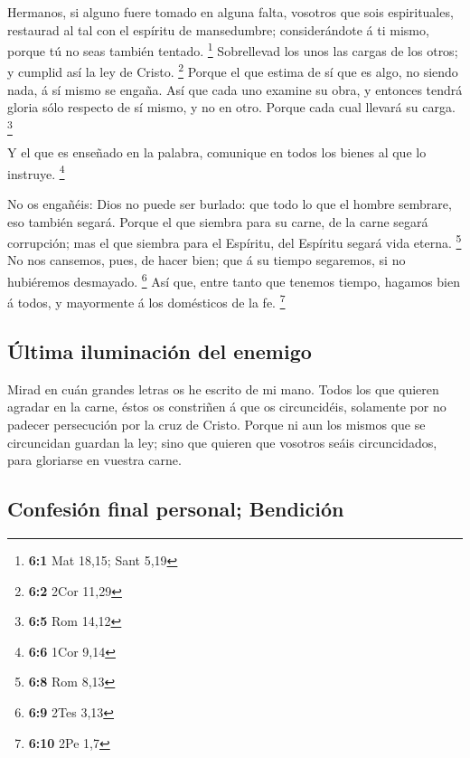 Hermanos, si alguno fuere tomado en alguna falta,
vosotros que sois espirituales, restaurad al tal con el espíritu de
mansedumbre; considerándote á ti mismo, porque tú no seas también
tentado. \footnote{\textbf{6:1} Mat 18,15; Sant 5,19} 
Sobrellevad los unos las cargas de los otros; y cumplid así la ley de
Cristo. \footnote{\textbf{6:2} 2Cor 11,29}  Porque el que
estima de sí que es algo, no siendo nada, á sí mismo se engaña.
 Así que cada uno examine su obra, y entonces tendrá
gloria sólo respecto de sí mismo, y no en otro.  Porque
cada cual llevará su carga. \footnote{\textbf{6:5} Rom 14,12}

 Y el que es enseñado en la palabra, comunique en todos
los bienes al que lo instruye. \footnote{\textbf{6:6} 1Cor 9,14}

 No os engañéis: Dios no puede ser burlado: que todo lo
que el hombre sembrare, eso también segará.  Porque el que
siembra para su carne, de la carne segará corrupción; mas el que siembra
para el Espíritu, del Espíritu segará vida eterna. \footnote{\textbf{6:8}
  Rom 8,13}  No nos cansemos, pues, de hacer bien; que á
su tiempo segaremos, si no hubiéremos desmayado. \footnote{\textbf{6:9}
  2Tes 3,13}  Así que, entre tanto que tenemos tiempo,
hagamos bien á todos, y mayormente á los domésticos de la fe.
\footnote{\textbf{6:10} 2Pe 1,7}

\hypertarget{uxfaltima-iluminaciuxf3n-del-enemigo}{%
\subsection{Última iluminación del
enemigo}\label{uxfaltima-iluminaciuxf3n-del-enemigo}}

 Mirad en cuán grandes letras os he escrito de mi mano.
 Todos los que quieren agradar en la carne, éstos os
constriñen á que os circuncidéis, solamente por no padecer persecución
por la cruz de Cristo.  Porque ni aun los mismos que se
circuncidan guardan la ley; sino que quieren que vosotros seáis
circuncidados, para gloriarse en vuestra carne.

\hypertarget{confesiuxf3n-final-personal-bendiciuxf3n}{%
\subsection{Confesión final personal;
Bendición}\label{confesiuxf3n-final-personal-bendiciuxf3n}}


